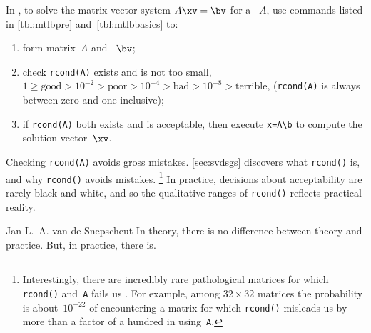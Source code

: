 \begin{procedure} \label{pro:unisol}
In \script, to solve the matrix-vector system \(A\xv=\bv\) for a ~\(A\), use commands listed in \autoref{tbl:mtlbpre} and~\ref{tbl:mtlbbasics} to:
\begin{enumerate}
\item form matrix~\(A\) and ~\(\bv\);
\item check \verb|rcond(A)| exists and is not too small, \(1\geq\text{good} >10^{-2} >\text{poor} >10^{-4} >\text{bad} >10^{-8} >\text{terrible}\), (\verb|rcond(A)| is always between zero and one inclusive);
\item if \verb|rcond(A)| both exists and is acceptable, then execute \verb|x=A\b| to compute the solution vector~\(\xv\). 
\end{enumerate}
\end{procedure}

Checking \verb|rcond(A)| avoids gross mistakes.
\autoref{sec:svdsgs} discovers what \verb|rcond()| is, and why \verb|rcond()| avoids mistakes.%
\footnote{Interestingly, there are incredibly rare pathological matrices for which \texttt{rcond()} and~\texttt{A\slosh} fails us \cite[]{Driscoll07}.  For example, among \(32\times32\) matrices the probability is about~\(10^{-22}\) of encountering a matrix for which \texttt{rcond()} misleads us by more than a factor of a hundred in using~\texttt{A\slosh}.}
In practice, decisions about acceptability are rarely black and white, and so the qualitative ranges of \verb|rcond()| reflects practical reality.

\begin{quoted}{Jan L.~A. van de Snepscheut}
In theory, there is no difference between theory and practice. 
But, in practice, there is. 
\end{quoted}



